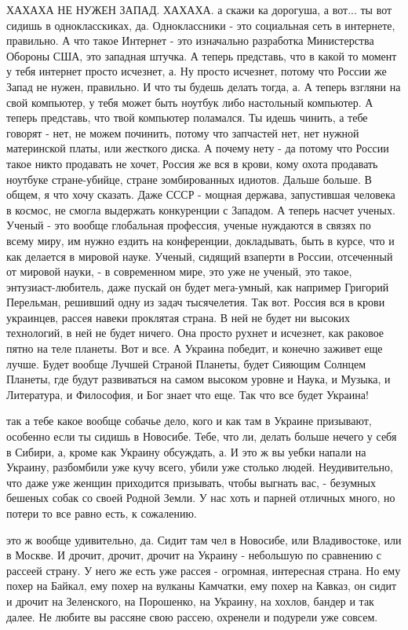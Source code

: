 ХАХАХА НЕ НУЖЕН ЗАПАД. ХАХАХА. а скажи ка дорогуша, а вот... ты вот сидишь в
однокласскиках, да. Одноклассники - это социальная сеть в интернете, правильно.
А что такое Интернет - это изначально разработка Министерства Обороны США, это
западная штучка. А теперь представь, что в какой то момент у тебя интернет
просто исчезнет, а. Ну просто исчезнет, потому что России же Запад не нужен,
правильно. И что ты будешь делать тогда, а. А теперь взгляни на свой компьютер,
у тебя может быть ноутбук либо настольный компьютер. А теперь представь, что
твой компьютер поламался. Ты идешь чинить, а тебе говорят - нет, не можем
починить, потому что запчастей нет, нет нужной материнской платы, или жесткого
диска. А почему нету - да потому что России такое никто продавать не хочет,
Россия же вся в крови, кому охота продавать ноутбуке стране-убийце, стране
зомбированных идиотов. Дальше больше. В общем, я что хочу сказать. Даже СССР -
мощная держава, запустившая человека в космос, не смогла выдержать конкуренции
с Западом. А теперь насчет ученых. Ученый - это вообще глобальная профессия,
ученые нуждаются в связях по всему миру, им нужно ездить на конференции,
докладывать, быть в курсе, что и как делается в мировой науке. Ученый, сидящий
взаперти в России, отсеченный от мировой науки, - в современном мире, это уже
не ученый, это такое, энтузиаст-любитель, даже пускай он будет мега-умный, как
например Григорий Перельман, решивший одну из задач тысячелетия. Так вот.
Россия вся в крови украинцев, рассея навеки проклятая страна. В ней не будет ни
высоких технологий, в ней не будет ничего. Она просто рухнет и исчезнет, как
раковое пятно на теле планеты. Вот и все. А Украина победит, и конечно заживет
еще лучше. Будет вообще Лучшей Страной Планеты, будет Сияющим Солнцем Планеты,
где будут развиваться на самом высоком уровне и Наука, и Музыка, и Литература,
и Философия, и Бог знает что еще. Так что все будет Украина!

так а тебе какое вообще собачье дело, кого и как там в Украине призывают,
особенно если ты сидишь в Новосибе. Тебе, что ли, делать больше нечего у себя в
Сибири, а, кроме как Украину обсуждать, а. И это ж вы уебки напали на Украину,
разбомбили уже кучу всего, убили уже столько людей. Неудивительно, что даже уже
женщин приходится призывать, чтобы выгнать вас, - безумных бешеных собак со
своей Родной Земли. У нас хоть и парней отличных много, но потери то все равно
есть, к сожалению.

это ж вообще удивительно, да. Сидит там чел в Новосибе,
или Владивостоке, или в Москве. И дрочит, дрочит, дрочит на Украину - небольшую
по сравнению с рассеей страну. У него же есть уже рассея - огромная, интересная
страна. Но ему похер на Байкал, ему похер на вулканы Камчатки, ему похер на
Кавказ, он сидит и дрочит на Зеленского, на Порошенко, на Украину, на хохлов,
бандер и так далее. Не любите вы рассяне свою рассею, охренели и подурели уже
совсем.

